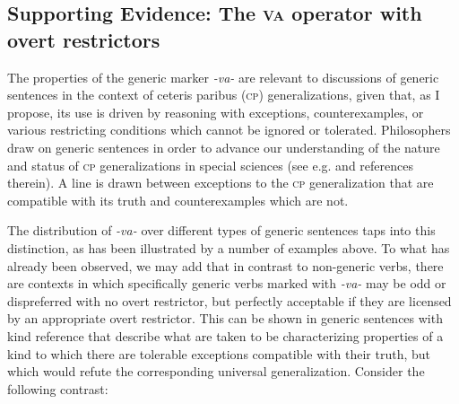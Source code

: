 \documentclass[output=paper,colorlinks,citecolor=brown]{langscibook}
\begin{document}

\subsection{Supporting Evidence: The \textsc{va} operator with overt restrictors}

The properties of the generic marker \textit{-va-} are relevant to discussions of generic sentences in the context of ceteris paribus (\textsc{cp}) generalizations, given that, as I propose,
its use is driven by reasoning
with exceptions, counterexamples, or various restricting
conditions which cannot be ignored or tolerated.
Philosophers draw on generic sentences in order to
advance our understanding of the nature and status of \textsc{cp} generalizations in special sciences (see e.g. \citealt{nickel2016} and references therein). A line is drawn between exceptions to the \textsc{cp} generalization that are compatible with its truth and counterexamples which are not.

The distribution of \textit{-va-} over different types of generic sentences taps into this distinction, as has been illustrated by a number of examples above. %
To what has already been observed, we may add that in contrast to non-generic verbs, there are contexts in which specifically generic verbs marked with \textit{-va-} may be odd or dispreferred with no overt restrictor, but
perfectly acceptable if they are licensed by an appropriate overt restrictor.
This can be shown in generic sentences with kind reference that describe what are taken to be characterizing properties of a kind to which there are tolerable exceptions compatible with their truth, but which would refute the corresponding universal generalization.
Consider the following contrast:
\end{document}
